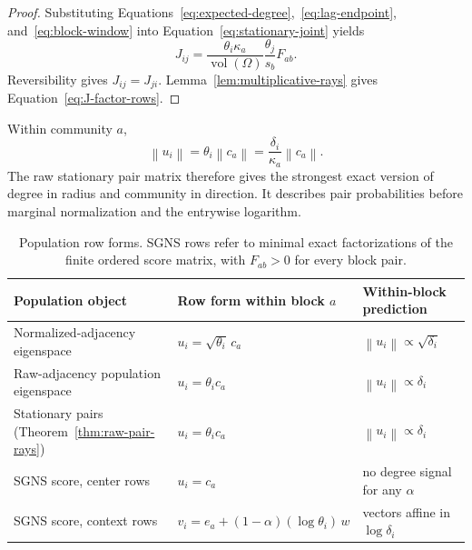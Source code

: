 \documentclass[aps,pre,reprint,superscriptaddress,longbibliography]{revtex4-2}
\newcommand{\norm}[1]{\left\lVert #1 \right\rVert}
\DeclareMathOperator{\vol}{vol}
\begin{document}
\begin{proof}
Substituting Equations~\eqref{eq:expected-degree},~\eqref{eq:lag-endpoint}, and~\eqref{eq:block-window} into Equation~\eqref{eq:stationary-joint} yields
\begin{equation}
    J_{ij}
    =
    \frac{\theta_i\kappa_a}{\vol(\Omega)}
    \frac{\theta_j}{s_b}F_{ab}.
\end{equation}
Reversibility gives \(J_{ij}=J_{ji}\).
Lemma~\ref{lem:multiplicative-rays} gives Equation~\eqref{eq:J-factor-rows}.
\end{proof}

Within community \(a\),
\begin{equation}
    \norm{u_i}
    =
    \theta_i\norm{c_a}
    =
    \frac{\delta_i}{\kappa_a}\norm{c_a}.
    \label{eq:raw-pair-norm}
\end{equation}
The raw stationary pair matrix therefore gives the strongest exact version of degree in radius and community in direction.
It describes pair probabilities before marginal normalization and the entrywise logarithm.

\begin{table}[t]
    \centering
    \caption{Population row forms. SGNS rows refer to minimal exact factorizations of the finite ordered score matrix, with \(F_{ab}>0\) for every block pair.}
    \label{tab:radial-exponents}
    \begin{tabular}{lll}
        \toprule
        Population object & Row form within block \(a\) & Within-block prediction \\
        \midrule
        Normalized-adjacency eigenspace~\citep{qin2013regularized}
            & \(u_i=\sqrt{\theta_i}\,c_a\)
            & \(\norm{u_i}\propto\sqrt{\delta_i}\) \\
        Raw-adjacency population eigenspace~\citep{jin2015fast}
            & \(u_i=\theta_i c_a\)
            & \(\norm{u_i}\propto\delta_i\) \\
        Stationary pairs (Theorem~\ref{thm:raw-pair-rays})
            & \(u_i=\theta_i c_a\)
            & \(\norm{u_i}\propto\delta_i\) \\
        SGNS score, center rows
            & \(u_i=c_a\)
            & no degree signal for any \(\alpha\) \\
        SGNS score, context rows
            & \(v_i=e_a+(1-\alpha)(\log\theta_i)\,w\)
            & vectors affine in \(\log\delta_i\) \\
        \bottomrule
    \end{tabular}
\end{table}
\end{document}

